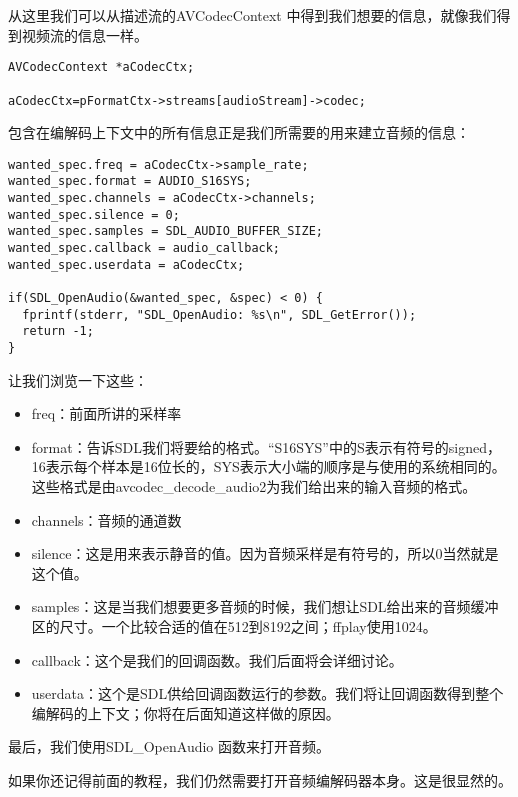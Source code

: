 从这里我们可以从描述流的AVCodecContext 中得到我们想要的信息，就像我们得到视频流的信息一样。

\begin{lstlisting}
AVCodecContext *aCodecCtx;

aCodecCtx=pFormatCtx->streams[audioStream]->codec;
\end{lstlisting}

包含在编解码上下文中的所有信息正是我们所需要的用来建立音频的信息：

\begin{lstlisting}
wanted_spec.freq = aCodecCtx->sample_rate;
wanted_spec.format = AUDIO_S16SYS;
wanted_spec.channels = aCodecCtx->channels;
wanted_spec.silence = 0;
wanted_spec.samples = SDL_AUDIO_BUFFER_SIZE;
wanted_spec.callback = audio_callback;
wanted_spec.userdata = aCodecCtx;

if(SDL_OpenAudio(&wanted_spec, &spec) < 0) {
  fprintf(stderr, "SDL_OpenAudio: %s\n", SDL_GetError());
  return -1;
}
\end{lstlisting}

让我们浏览一下这些：
\begin{itemize}
  \item freq：前面所讲的采样率

  \item format：告诉SDL我们将要给的格式。“S16SYS”中的S表示有符号的signed，16表示每个样本是16位长的，SYS表示大小端的顺序是与使用的系统相同的。这些格式是由avcodec_decode_audio2为我们给出来的输入音频的格式。

  \item channels：音频的通道数

  \item silence：这是用来表示静音的值。因为音频采样是有符号的，所以0当然就是这个值。

  \item samples：这是当我们想要更多音频的时候，我们想让SDL给出来的音频缓冲区的尺寸。一个比较合适的值在512到8192之间；ffplay使用1024。

  \item callback：这个是我们的回调函数。我们后面将会详细讨论。

  \item userdata：这个是SDL供给回调函数运行的参数。我们将让回调函数得到整个编解码的上下文；你将在后面知道这样做的原因。

\end{itemize}

最后，我们使用SDL_OpenAudio 函数来打开音频。

如果你还记得前面的教程，我们仍然需要打开音频编解码器本身。这是很显然的。

